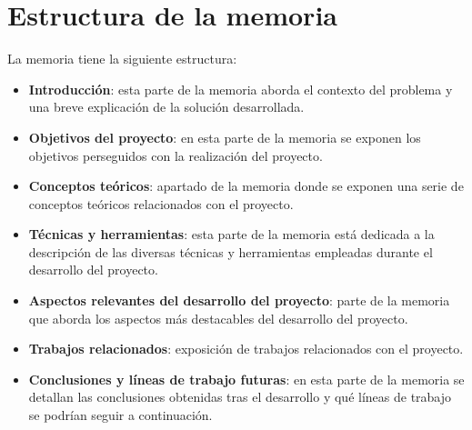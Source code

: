 \section{Estructura de la memoria}

La memoria tiene la siguiente estructura:

\begin{itemize}
\tightlist
	\item \textbf{Introducción}: esta parte de la memoria aborda el contexto del problema y una breve explicación de la solución desarrollada.
	\item \textbf{Objetivos del proyecto}: en esta parte de la memoria se exponen los objetivos perseguidos con la realización del proyecto. 
	\item \textbf{Conceptos teóricos}: apartado de la memoria donde se exponen una serie de conceptos teóricos relacionados con el proyecto.
	\item \textbf{Técnicas y herramientas}: esta parte de la memoria está dedicada a la descripción de las diversas técnicas y herramientas empleadas durante el desarrollo del proyecto.
	\item \textbf{Aspectos relevantes del desarrollo del proyecto}: parte de la memoria que aborda los aspectos más destacables del desarrollo del proyecto.
	\item \textbf{Trabajos relacionados}: exposición de trabajos relacionados con el proyecto.
	\item \textbf{Conclusiones y líneas de trabajo futuras}: en esta parte de la memoria se detallan las conclusiones obtenidas tras el desarrollo y qué líneas de trabajo se podrían seguir a continuación.
\end{itemize}
